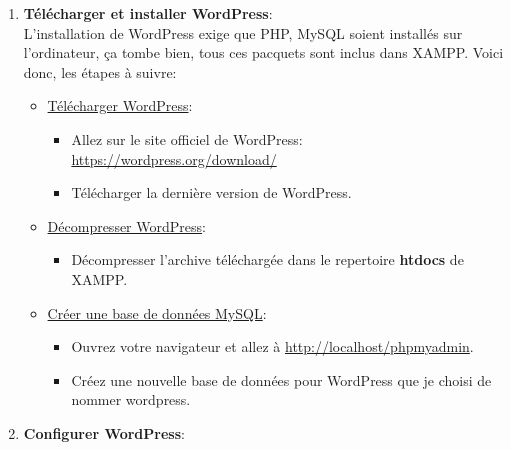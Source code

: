 \documentclass[a4paper,11pt]{article}
\begin{document}
\begin{enumerate}
                    \item \textbf{Télécharger et installer WordPress}:\\
                        \noindent L'installation de WordPress exige que PHP, MySQL soient installés sur l'ordinateur, ça tombe bien, tous ces pacquets 
                        sont inclus dans XAMPP. Voici donc, les étapes à suivre: 
                        \begin{itemize}
                            \item \underline{Télécharger WordPress}:
                                \begin{itemize}
                                    \item Allez sur le site officiel de WordPress: \url{https://wordpress.org/download/}
                                    \item Télécharger la dernière version de WordPress.
                                \end{itemize}
                            \item \underline{Décompresser WordPress}:
                                \begin{itemize}
                                    \item Décompresser l'archive téléchargée dans le repertoire \textbf{htdocs} de XAMPP.
                                \end{itemize}
                            \item \underline{Créer une base de données MySQL}:
                                \begin{itemize}
                                    \item Ouvrez votre navigateur et allez à \url{http://localhost/phpmyadmin}.
                                    \item Créez une nouvelle base de données pour WordPress que je choisi de nommer wordpress.
                                \end{itemize}
                        \end{itemize}

                    \item \textbf{Configurer WordPress}:
                        \begin{itemize}
                            

\end{itemize}
\end{enumerate}
\end{document}
